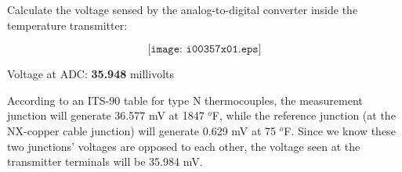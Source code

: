 

Calculate the voltage sensed by the analog-to-digital converter inside the temperature transmitter:

$$\texttt{[image: i00357x01.eps]}$$







Voltage at ADC: {\bf 35.948} millivolts

\vskip 10pt

According to an ITS-90 table for type N thermocouples, the measurement junction will generate 36.577 mV at 1847 $^{o}$F, while the reference junction (at the NX-copper cable junction) will generate 0.629 mV at 75 $^{o}$F.  Since we know these two junctions' voltages are opposed to each other, the voltage seen at the transmitter terminals will be 35.984 mV.









